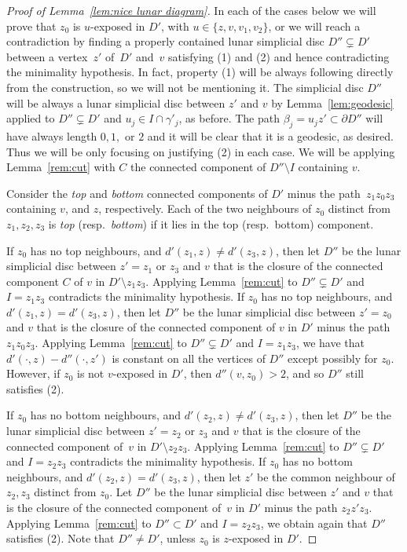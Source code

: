 \documentclass[a4paper,12pt,leqno]{amsart}
\theoremstyle{definition}
\begin{document}
\begin{proof}[Proof of Lemma~\ref{lem:nice lunar diagram}]
In each of the cases below we will prove that $z_0$ is $u$-exposed in $D'$, with $u\in \{z,v,v_1,v_2\}$, or we will reach a contradiction by finding a properly contained lunar simplicial disc $D''\subsetneq D'$ between a vertex~$z'$ of~$D'$ and~$v$ satisfying (1) and (2) and hence contradicting the minimality hypothesis.
In fact, property (1) will be always following directly from the construction, so we will not be mentioning it. The simplicial disc $D''$ will be always a lunar simplicial disc between $z'$ and $v$ by Lemma~\ref{lem:geodesic} applied to $D''\subsetneq D'$ and $u_j\in I\cap \gamma'_j$, as before. The path $\beta_j=u_jz'\subset \partial D''$ will have always length $0,1,$ or $2$ and it will be clear that it is a geodesic, as desired. Thus we will be only focusing on justifying (2) in each case.
We will be applying Lemma~\ref{rem:cut} with $C$ the connected component of $D''\setminus I$ containing $v$.

Consider the \emph{top} and \emph{bottom} connected components of $D'$ minus the path~$z_1z_0z_3$ containing $v$, and $z$, respectively. Each of the two neighbours of $z_0$ distinct from $z_1,z_2,z_3$ is \emph{top} (resp.\ \emph{bottom}) if it lies in the top (resp.\ bottom) component. 

If $z_0$ has no top neighbours, and $d'(z_1,z)\neq d'(z_3,z)$, then let $D''$ be the lunar simplicial disc between $z'=z_1$ or $z_3$ and $v$ that is the closure of the connected component $C$ of $v$ in $D'\setminus z_1z_3$. Applying Lemma~\ref{rem:cut} to $D''\subsetneq D'$ and $I=z_1z_3$ contradicts the minimality hypothesis. If $z_0$ has no top neighbours, and $d'(z_1,z)= d'(z_3,z)$, then let $D''$ be the lunar simplicial disc between $z'=z_0$ and $v$ that is the closure of the connected component of $v$ in $D'$ minus the path $z_1z_0z_3$. Applying Lemma~\ref{rem:cut} to $D''\subsetneq D'$ and $I=z_1z_3$, we have that $d'(\cdot,z)-d''(\cdot,z')$ is constant on all the vertices of $D''$ except possibly for $z_0$. However, if $z_0$ is not $v$-exposed in $D'$, then $d''(v,z_0)>2$, and so $D''$ still satisfies (2).

If $z_0$ has no bottom neighbours, and $d'(z_2,z)\neq d'(z_3,z)$, then let $D''$ be the lunar simplicial disc between $z'=z_2$ or $z_3$ and $v$ that is the closure of the connected component of~$v$ in $D'\setminus z_2z_3$. Applying Lemma~\ref{rem:cut} to $D''\subsetneq D'$ and $I=z_2z_3$ contradicts the minimality hypothesis. If $z_0$ has no bottom neighbours, and $d'(z_2,z)= d'(z_3,z)$, then let $z'$ be the common neighbour of $z_2,z_3$ distinct from $z_0$. Let $D''$ be the lunar simplicial disc between $z'$ and $v$ that is the closure of the connected component of~$v$ in $D'$ minus the path $z_2z'z_3$. Applying Lemma~\ref{rem:cut} to $D''\subset D'$ and $I=z_2z_3$, we obtain again that $D''$ satisfies (2). Note that $D''\neq D'$, unless $z_0$ is $z$-exposed in $D'$.


\end{proof}
\end{document}
